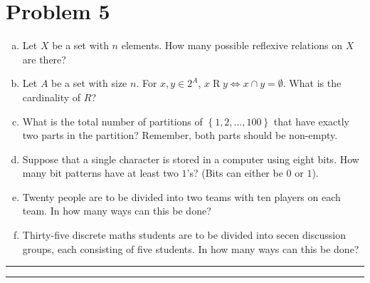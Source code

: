 \documentclass{article}
\theoremstyle{definition}
\newenvironment{solution}{\bigskip\hrule{\hfill}}{\bigskip\hrule{\hfill}} %
\begin{document}
\section*{Problem 5}
\begin{enumerate}[a)] %
    \item Let $X$ be a set with $n$ elements. How many possible reflexive relations on $X$ are there?
    \item Let $A$ be a set with size $n$. For $x,y\in 2^A$, $x\mathrel{R}y\Longleftrightarrow x\cap y=\emptyset$. What is the cardinality of $R$?
    \item What is the total number of partitions of $\left\{1,2,\dots,100\right\}$ that have exactly two parts in the partition? Remember, both parts should be non-empty.
    \item Suppose that a single character is stored in a computer using eight bits. How many bit patterns have at least two $1$'s? (Bits can either be $0$ or $1$).
    \item Twenty people are to be divided into two teams with ten players on each team. In how many ways can this be done?
    \item Thirty-five discrete maths students are to be divided into secen discussion groups, each consisting of five students. In how many ways can this be done?
\end{enumerate}
\begin{solution}


\end{solution}


\newpage

\end{document}
